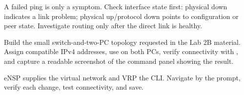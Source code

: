 \begin{pitfall}
A failed ping is only a symptom. Check interface state first: physical down indicates a link problem; physical up/protocol down points to configuration or peer state. Investigate routing only after the direct link is healthy.
\end{pitfall}

\begin{tryit}
Build the small switch-and-two-PC topology requested in the Lab 2B material. Assign compatible IPv4 addresses, use  on both PCs, verify connectivity with , and capture a readable screenshot of the command panel showing the result.
\end{tryit}

\begin{chapterrecap}
eNSP supplies the virtual network and VRP the CLI. Navigate by the prompt, verify each change, test connectivity, and save.
\end{chapterrecap}


